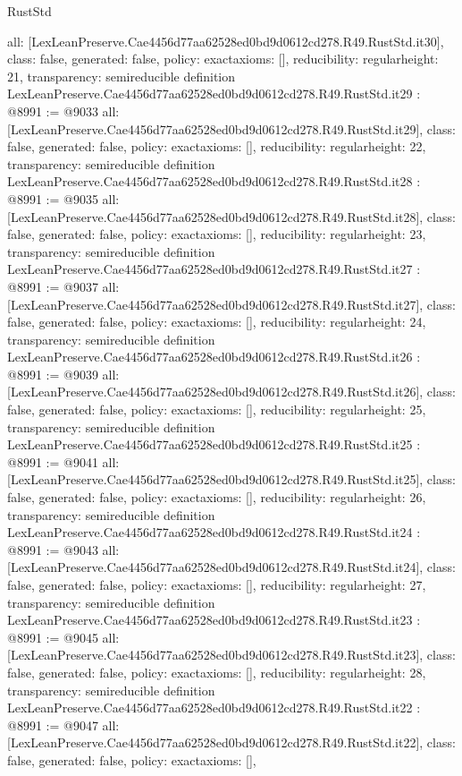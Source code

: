 \begin{lexlean}{RustStd}
\begin{coremodule}
{  all: [LexLeanPreserve.Cae4456d77aa62528ed0bd9d0612cd278.R49.RustStd.it30],
  class: false,
  generated: false,
  policy: exact{axioms: []},
  reducibility: regular{height: 21},
  transparency: semireducible
}
definition LexLeanPreserve.Cae4456d77aa62528ed0bd9d0612cd278.R49.RustStd.it29 : @8991 := @9033 {
  all: [LexLeanPreserve.Cae4456d77aa62528ed0bd9d0612cd278.R49.RustStd.it29],
  class: false,
  generated: false,
  policy: exact{axioms: []},
  reducibility: regular{height: 22},
  transparency: semireducible
}
definition LexLeanPreserve.Cae4456d77aa62528ed0bd9d0612cd278.R49.RustStd.it28 : @8991 := @9035 {
  all: [LexLeanPreserve.Cae4456d77aa62528ed0bd9d0612cd278.R49.RustStd.it28],
  class: false,
  generated: false,
  policy: exact{axioms: []},
  reducibility: regular{height: 23},
  transparency: semireducible
}
definition LexLeanPreserve.Cae4456d77aa62528ed0bd9d0612cd278.R49.RustStd.it27 : @8991 := @9037 {
  all: [LexLeanPreserve.Cae4456d77aa62528ed0bd9d0612cd278.R49.RustStd.it27],
  class: false,
  generated: false,
  policy: exact{axioms: []},
  reducibility: regular{height: 24},
  transparency: semireducible
}
definition LexLeanPreserve.Cae4456d77aa62528ed0bd9d0612cd278.R49.RustStd.it26 : @8991 := @9039 {
  all: [LexLeanPreserve.Cae4456d77aa62528ed0bd9d0612cd278.R49.RustStd.it26],
  class: false,
  generated: false,
  policy: exact{axioms: []},
  reducibility: regular{height: 25},
  transparency: semireducible
}
definition LexLeanPreserve.Cae4456d77aa62528ed0bd9d0612cd278.R49.RustStd.it25 : @8991 := @9041 {
  all: [LexLeanPreserve.Cae4456d77aa62528ed0bd9d0612cd278.R49.RustStd.it25],
  class: false,
  generated: false,
  policy: exact{axioms: []},
  reducibility: regular{height: 26},
  transparency: semireducible
}
definition LexLeanPreserve.Cae4456d77aa62528ed0bd9d0612cd278.R49.RustStd.it24 : @8991 := @9043 {
  all: [LexLeanPreserve.Cae4456d77aa62528ed0bd9d0612cd278.R49.RustStd.it24],
  class: false,
  generated: false,
  policy: exact{axioms: []},
  reducibility: regular{height: 27},
  transparency: semireducible
}
definition LexLeanPreserve.Cae4456d77aa62528ed0bd9d0612cd278.R49.RustStd.it23 : @8991 := @9045 {
  all: [LexLeanPreserve.Cae4456d77aa62528ed0bd9d0612cd278.R49.RustStd.it23],
  class: false,
  generated: false,
  policy: exact{axioms: []},
  reducibility: regular{height: 28},
  transparency: semireducible
}
definition LexLeanPreserve.Cae4456d77aa62528ed0bd9d0612cd278.R49.RustStd.it22 : @8991 := @9047 {
  all: [LexLeanPreserve.Cae4456d77aa62528ed0bd9d0612cd278.R49.RustStd.it22],
  class: false,
  generated: false,
  policy: exact{axioms: []},
}
\end{coremodule}
\end{lexlean}
